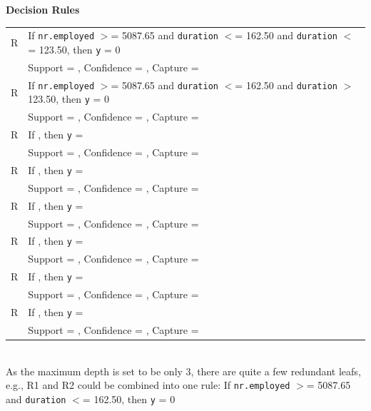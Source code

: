 \documentclass[11pt,a4paper]{article}
\newcounter{magicrownumbers}
\begin{document}
    
    \noindent
    \textbf{Decision Rules} \\
    {

        
    }

    \setcounter{magicrownumbers}{0}
    \newcommand\rules{\stepcounter{magicrownumbers}\arabic{magicrownumbers}}
    \begin{tabular}{r l}
        R\rules & If \texttt{nr.employed} $>$= 5087.65 and \texttt{duration} $<$= 162.50 and \texttt{duration} $<$= 123.50, then \texttt{y} = 0 \\
        & Support = , Confidence = , Capture = \\
        R\rules & If \texttt{nr.employed} $>$= 5087.65 and \texttt{duration} $<$= 162.50 and \texttt{duration} $>$ 123.50, then \texttt{y} = 0 \\
        & Support = , Confidence = , Capture = \\
        R\rules & If , then \texttt{y} =  \\
        & Support = , Confidence = , Capture = \\
        R\rules & If , then \texttt{y} =  \\
        & Support = , Confidence = , Capture = \\
        R\rules & If , then \texttt{y} =  \\
        & Support = , Confidence = , Capture = \\
        R\rules & If , then \texttt{y} =  \\
        & Support = , Confidence = , Capture = \\
        R\rules & If , then \texttt{y} =  \\
        & Support = , Confidence = , Capture = \\
        R\rules & If , then \texttt{y} =  \\
        & Support = , Confidence = , Capture = \\
        
    \end{tabular} \\
    As the maximum depth is set to be only 3, there are quite a few redundant leafs, e.g., R1 and R2 could be combined into one rule: If \texttt{nr.employed} $>$= 5087.65 and \texttt{duration} $<$= 162.50, then \texttt{y} = 0
    
\end{document}

